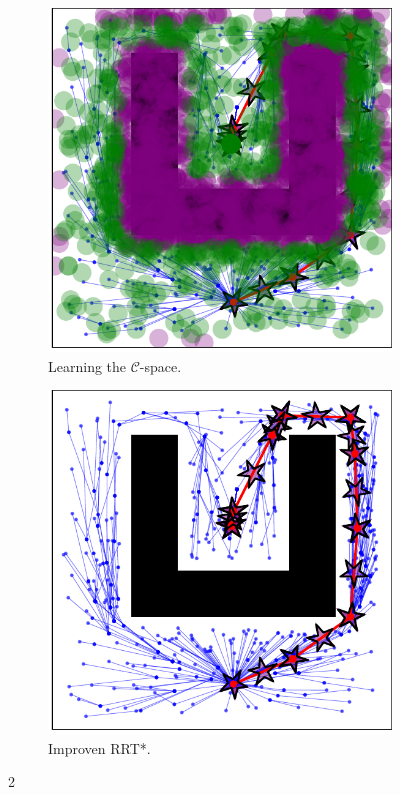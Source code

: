 \documentclass{ctuthesis}
\begin{document}
\begin{figure}[!ht]
  \centering 
  \begin{subfigure}[b]{0.45\textwidth}
      \includegraphics[width=\textwidth]{figChap4/RRTstar2DML_learning237.2.pdf}
      \caption{Learning the $\mathcal{C}$-space.}
      \label{fig:rrtstarML2D_learning}
  \end{subfigure}  
  \begin{subfigure}[b]{0.45\textwidth}
      \includegraphics[width=\textwidth]{figChap4/RRTstar2DML_maze237.2.pdf}
      \caption{Improven RRT*.}
  \end{subfigure}
  \caption{2}
  \label{fig:LearningConfigSpace2D}
\end{figure}
\end{document}
